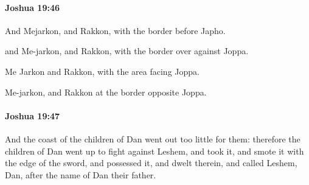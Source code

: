 		\paragraph{Joshua 19:46} %
			\label{JOSHUA-19-46}

			And Mejarkon, and Rakkon, with the border before Japho.

			\begin{versebox}
					\item[BHS] 
					\item[ASV] and Me-jarkon, and Rakkon, with the border over against Joppa.
					\item[NIV] Me Jarkon and Rakkon, with the area facing Joppa.
					\item[NRSV] Me-jarkon, and Rakkon at the border opposite Joppa.
			\end{versebox}

		\paragraph{Joshua 19:47} %
			\label{JOSHUA-19-47}

			And the coast of the children of Dan went out too little for them: therefore the children of Dan went up to fight against Leshem, and took it, and smote it with the edge of the sword, and possessed it, and dwelt therein, and called Leshem, Dan, after the name of Dan their father.

